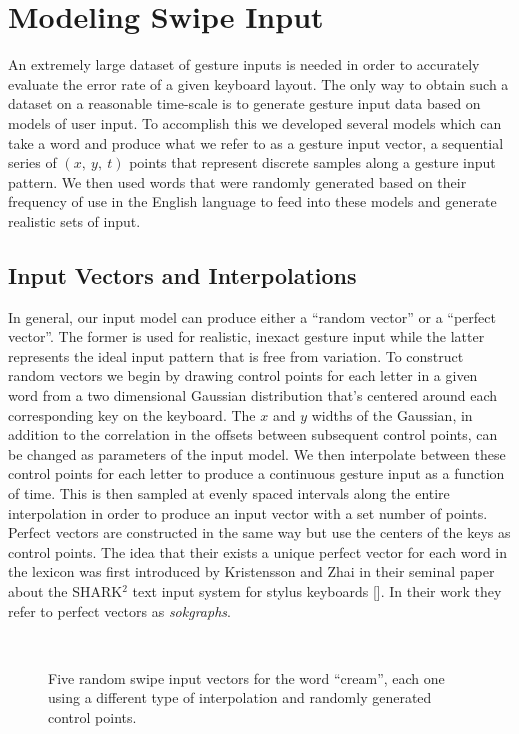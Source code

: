 \documentclass[final,1p,times,authoryear]{elsarticle}
\begin{document}
\section{\textbf{Modeling Swipe Input}}\label{sec:Modeling-Swipe-Input}

An extremely large dataset of gesture inputs is needed in order to accurately
evaluate the error rate of a given keyboard layout. The only way to 
obtain such a dataset on a reasonable time-scale is to generate
gesture input data based on models of user input. To accomplish
this we developed several models which can take a word and produce
what we refer to as a gesture input vector, a sequential series of $\left(x,\ y,\ t\right)$
points that represent discrete samples along a gesture input pattern. We then
used words that were randomly generated based on their frequency of
use in the English language to feed into these models and generate
realistic sets of input.


\subsection{Input Vectors and Interpolations\label{sub:Input-Vectors-and}}
In general, our input model can produce either a ``random vector''
or a ``perfect vector''. The former is used for realistic, inexact
gesture input while the latter represents the ideal input pattern that
is free from variation. To construct random vectors we begin by drawing
control points for each letter in a given word from a two dimensional
Gaussian distribution that's centered around each corresponding key
on the keyboard. The $x$ and $y$ widths of the Gaussian, in addition
to the correlation in the offsets between subsequent control points,
can be changed as parameters of the input model. We then interpolate
between these control points for each letter to produce a continuous
gesture input as a function of time. This is then sampled at evenly
spaced intervals along the entire interpolation in order to produce an input
vector with a set number of points. Perfect vectors are constructed
in the same way but use the centers of the keys as control points. The
idea that their exists a unique perfect vector for each word in the lexicon was first 
introduced by Kristensson and Zhai in their seminal paper about the SHARK$^2$ 
text input system for stylus keyboards [\cite{SHARK2}]. In their work they 
refer to perfect vectors as \textit{sokgraphs}.

\begin{figure}[tp]
\begin{centering}
 \\
\par\end{centering}
\protect\caption{Five random swipe input vectors for the word ``cream'', each one
using a different type of interpolation and randomly generated control
points.\label{fig:Five-different-random}}
\end{figure}
\end{document}
